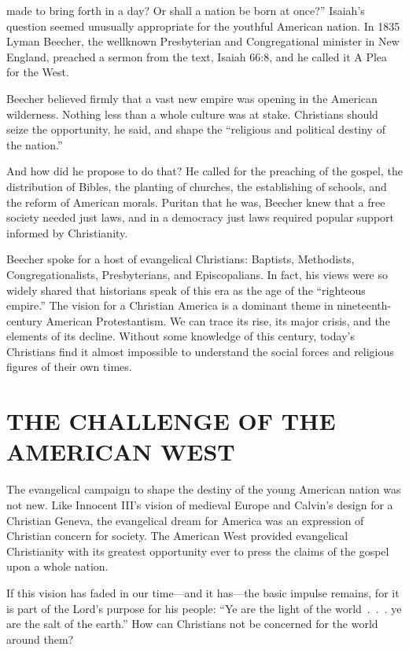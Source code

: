 
 made to bring forth in a day? Or shall a nation be born at once?”
Isaiah’s question seemed unusually appropriate for the youthful American nation. In 1835 Lyman
Beecher, the wellknown Presbyterian and Congregational minister in New England, preached a sermon
from the text, Isaiah 66:8, and he called it A Plea for the West.

Beecher believed firmly that a vast new empire was opening in the American wilderness. Nothing less
than a whole culture was at stake. Christians should seize the opportunity, he said, and shape the
“religious and political destiny of the nation.”

And how did he propose to do that? He called for the preaching of the gospel, the distribution of
Bibles, the planting of churches, the establishing of schools, and the reform of American morals.
Puritan that he was, Beecher knew that a free society needed just laws, and in a democracy just laws
required popular support informed by Christianity.

Beecher spoke for a host of evangelical Christians: Baptists, Methodists, Congregationalists,
Presbyterians, and Episcopalians. In fact, his views were so widely shared that historians speak of
this era as the age of the “righteous empire.” The vision for a Christian America is a dominant
theme in nineteenth-century American Protestantism. We can trace its rise, its major crisis, and the
elements of its decline. Without some knowledge of this century, today’s Christians find it almost
impossible to understand the social forces and religious figures of their own times.

\section{THE CHALLENGE OF THE AMERICAN WEST}

The evangelical campaign to shape the destiny of the young American nation was not new. Like
Innocent III’s vision of medieval Europe and Calvin’s design for a Christian Geneva, the evangelical
dream for America was an expression of Christian concern for society. The American West provided
evangelical Christianity with its greatest opportunity ever to press the claims of the gospel upon a
whole nation.

If this vision has faded in our time—and it has—the basic impulse remains, for it is part of the
Lord’s purpose for his people: “Ye are the light of the world~.~.~. ye are the salt of the earth.”
How can Christians not be concerned for the world around them?

